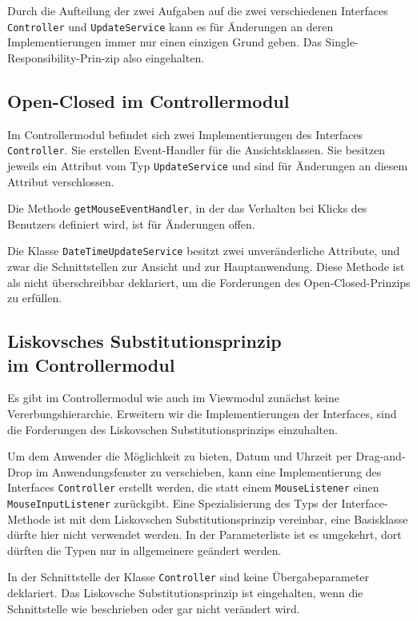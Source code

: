 \documentclass{vldb}
\begin{document}
Durch die Aufteilung der zwei Aufgaben auf die zwei verschiedenen Interfaces \texttt{Controller} und \texttt{UpdateService} kann es für Änderungen an deren Implementierungen immer nur einen einzigen Grund geben. Das Single-Responsibility-Prin-zip also eingehalten.

\subsection{Open-Closed im Controllermodul}
Im Controllermodul befindet sich zwei Implementierungen des Interfaces \texttt{Controller}. Sie erstellen Event-Handler für die Ansichtsklassen. Sie besitzen jeweils ein Attribut vom Typ \texttt{UpdateService} und sind für Änderungen an diesem Attribut verschlossen.

Die Methode \texttt{getMouseEventHandler}, in der das Verhalten bei Klicks des Benutzers definiert wird, ist für Änderungen offen.

Die Klasse \texttt{DateTimeUpdateService} besitzt zwei un\-ver\-än\-der\-li\-che Attribute, und zwar die Schnittstellen zur Ansicht und zur Hauptanwendung. Diese Methode ist als nicht überschreibbar deklariert, um die Forderungen des Open-Closed-Prinzips zu erfüllen.

\subsection{Liskovsches Substitutionsprinzip\\im Controllermodul}
Es gibt im Controllermodul wie auch im Viewmodul zu\-nächst keine Vererbungshierarchie. Erweitern wir die Implementierungen der Interfaces, sind die Forderungen des Liskovschen Substitutionsprinzips einzuhalten.

Um dem Anwender die Möglichkeit zu bieten, Datum und Uhrzeit per Drag-and-Drop im Anwendungsfenster zu verschieben, kann eine Implementierung des Interfaces \texttt{Con\-troller} erstellt werden, die statt einem \texttt{MouseListener} ei\-nen \texttt{MouseInputListener} zurückgibt. Eine Spe\-zia\-li\-sie\-rung des Typs der Interface-Methode ist mit dem Liskovschen Substitutionsprinzip vereinbar, eine Basisklasse dürfte hier nicht verwendet werden. In der Parameterliste ist es um\-ge\-kehrt, dort dürften die Typen nur in allgemeinere geändert werden.

In der Schnittstelle der Klasse \texttt{Controller} sind keine Über\-gabeparameter deklariert. Das Liskovsche Substitutions\-prinzip ist eingehalten, wenn die Schnittstelle wie be\-schrie\-ben oder gar nicht verändert wird.
\end{document}
